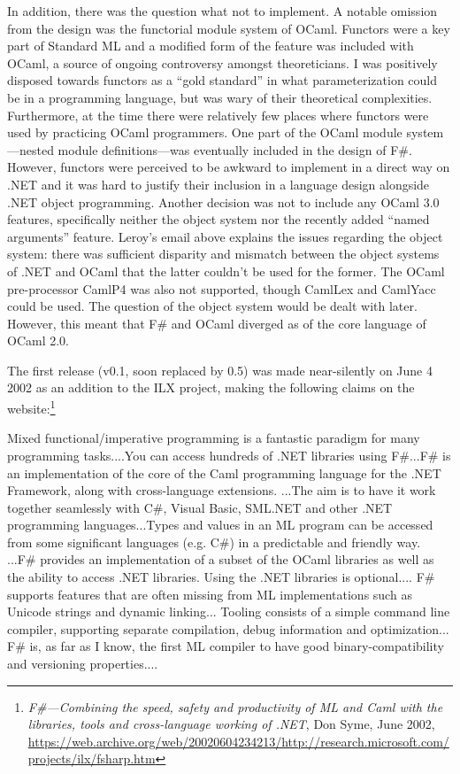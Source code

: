 \documentclass[acmsmall]{acmart}\settopmatter{}
\begin{document}
In addition, there was the question what not to implement.  A notable omission from the design was the functorial module system of OCaml.  Functors were a key part of Standard ML and a modified form of the feature was included with OCaml, a source of ongoing controversy amongst theoreticians.  I was positively disposed towards functors as a “gold standard” in what parameterization could be in a programming language, but was wary of their theoretical complexities. Furthermore, at the time there were relatively few places where functors were used by practicing OCaml programmers. One part of the OCaml module system---nested module definitions---was eventually included in the design of F\#.  However, functors were perceived to be awkward to implement in a direct way on .NET and it was hard to justify their inclusion in a language design alongside .NET object programming. Another decision was not to include any OCaml 3.0 features, specifically neither the object system nor the recently added “named arguments” feature.  Leroy’s email above explains the issues regarding the object system: there was sufficient disparity and mismatch between the object systems of .NET and OCaml that the latter couldn’t be used for the former.  The OCaml pre-processor CamlP4 was also not supported, though CamlLex and CamlYacc could be used. The question of the object system would be dealt with later.  However, this meant that F\# and OCaml diverged as of the core language of OCaml 2.0.


The first release (v0.1, soon replaced by 0.5) was made near-silently on June 4 2002 as an addition to the ILX project, making the following claims on the website:\footnote{\textit{F\#---Combining the speed, safety and productivity of ML and Caml with the libraries, tools and cross-language working of .NET}, Don Syme, June 2002, \url{https://web.archive.org/web/20020604234213/http://research.microsoft.com/projects/ilx/fsharp.htm}}
\begin{verbquote}
Mixed functional/imperative programming is a fantastic paradigm for many programming tasks....You can access hundreds of .NET libraries using F#...F# is an implementation of the core of the Caml programming language for the .NET Framework, along with cross-language extensions. ...The aim is to have it work together seamlessly with C#, Visual Basic, SML.NET and other .NET programming languages...Types and values in an ML program can be accessed from some significant languages (e.g. C#) in a predictable and friendly way. ...F# provides an implementation of a subset of the OCaml libraries as well as the ability to access .NET libraries.  Using the .NET libraries is optional.... F# supports features that are often missing from ML implementations such as Unicode strings and dynamic linking... Tooling consists of a simple command line compiler, supporting separate compilation, debug information and optimization... F# is, as far as I know, the first ML compiler to have good binary-compatibility and versioning properties....
\end{verbquote}
\end{document}
